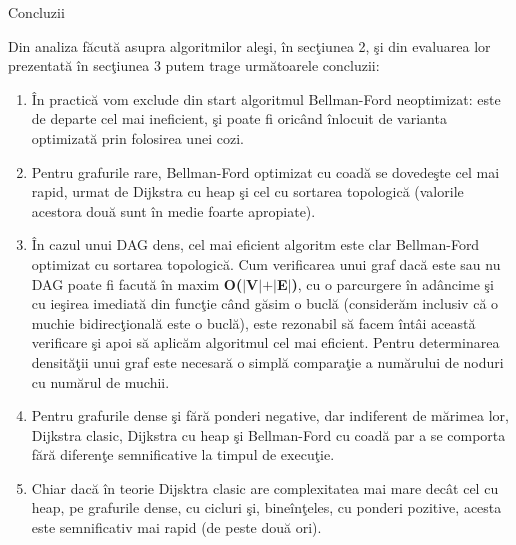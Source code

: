 \documentclass[a4paper]{article}
\begin{document}
\begin{section}{Concluzii\\}

	Din analiza f\u acut\u a asupra algoritmilor ale\c si, \^ in sec\c tiunea 2, \c si din evaluarea lor prezentat\u a \^ in sec\c tiunea 3 putem trage urm\u atoarele concluzii:

\begin{enumerate}
	\item \^ In practic\u a vom exclude din start algoritmul Bellman-Ford neoptimizat: este de departe cel mai ineficient, \c si poate fi oric\^ and \^ inlocuit de varianta optimizat\u a prin folosirea unei cozi.

	\item Pentru grafurile rare, Bellman-Ford optimizat cu coad\u a se dovede\c ste cel mai rapid, urmat de Dijkstra cu heap \c si cel cu sortarea topologic\u a (valorile acestora dou\u a sunt \^ in medie foarte apropiate).

	\item \^ In cazul unui DAG dens, cel mai eficient algoritm este clar Bellman-Ford optimizat cu sortarea topologic\u a. Cum verificarea unui graf dac\u a este sau nu DAG poate fi facut\u a \^ in maxim \textbf{O($|$V$|$$+$$|$E$|$)}, cu o parcurgere \^ in ad\^ ancime \c si cu ie\c sirea imediat\u a din func\c tie c\^ and g\u asim o bucl\u a (consider\u am inclusiv c\u a o muchie bidirec\c tional\u a este o bucl\u a), este rezonabil s\u a facem \^ int\^ ai aceast\u a verificare \c si apoi s\u a aplic\u am algoritmul cel mai eficient. Pentru determinarea densit\u a\c tii unui graf este necesar\u a o simpl\u a compara\c tie a num\u arului de noduri cu num\u arul de muchii.
	
	\item Pentru grafurile dense \c si f\u ar\u a ponderi negative, dar indiferent de m\u arimea lor, Dijkstra clasic, Dijkstra cu heap \c si Bellman-Ford cu coad\u a par a se comporta f\u ar\u a diferen\c te semnificative la timpul de execu\c tie.

	\item Chiar dac\u a \^ in teorie Dijsktra clasic are complexitatea mai mare dec\^ at cel cu heap, pe grafurile dense, cu cicluri \c si, bine\^ in\c teles, cu ponderi pozitive, acesta este semnificativ mai rapid (de peste dou\u a ori). \\

\end{enumerate}
\end{section}
\pagebreak
\end{document}
